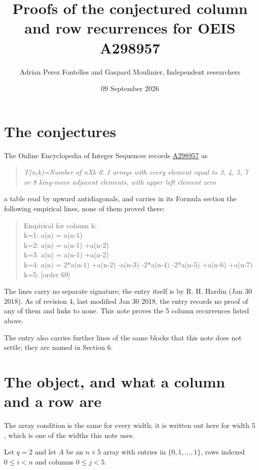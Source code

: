 \documentclass[11pt]{article}
\title{Proofs of the conjectured column and row recurrences for OEIS A298957}
\author{Adrian Perez Fontelles and Gaspard Moulinier, Independent researchers}
\date{09 September 2026}
\theoremstyle{definition}
\begin{document}
\maketitle
\section{The conjectures}

The Online Encyclopedia of Integer Sequences records \href{https://oeis.org/A298957}{A298957} as

\begin{quote}\itshape T(n,k)=Number of nXk 0..1 arrays with every element equal to 3, 4, 5, 7 or 8 king-move adjacent elements, with upper left element zero\end{quote}

a table read by upward antidiagonals, and carries in its Formula section the following empirical lines, none of them proved there:

\begin{quote}\ttfamily Empirical for column k:\\
k=1: a(n) = a(n-1)\\k=2: a(n) = a(n-1) +a(n-2)\\k=3: a(n) = a(n-1) +a(n-2)\\k=4: a(n) = 2*a(n-1) +a(n-2) -a(n-3) -2*a(n-4) -2*a(n-5) +a(n-6) +a(n-7)\\k=5: [order 69]\end{quote}

The lines carry no separate signature; the entry itself is by R. H. Hardin (Jan 30 2018). As of revision 4, last modified Jan 30 2018, the entry records no proof of any of them and links to none. This note proves the 5 column recurrences listed above.

The entry also carries further lines of the same blocks that this note does not settle; they are named in Section 6.

\section{The object, and what a column and a row are}

The array condition is the same for every width; it is written out here for width $5$, which is one of the widths this note uses.

Let $q = 2$ and let $A$ be an $n \times 5$ array with entries in $\{0,1,\dots,1\}$, rows indexed $0 \le i < n$ and columns $0 \le j < 5$.
\end{document}
